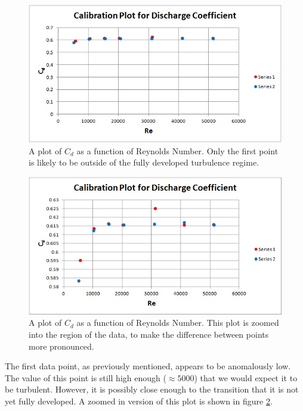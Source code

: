 \documentclass{article}
\begin{document}
  \begin{figure}[!htb]
   \begin{center}
    \includegraphics[width = 12 cm]{figs/cd_v_re_zero_axis.jpg}
    \caption{A plot of $C_d$ as a function of Reynolds Number. Only the first point is likely to be 
outside of the fully developed turbulence regime. }
    \label{orif}
   \end{center}
  \end{figure}

  \begin{figure}[!htb]
   \begin{center}
    \includegraphics[width = 12 cm]{figs/cd_v_re.jpg}
    \caption{A plot of $C_d$ as a function of Reynolds Number. This plot is zoomed into the region of the data, 
    to make the difference between points more pronounced.}
    \label{orif-zoom}
   \end{center}
  \end{figure}

The first data point, as previously mentioned, appears to be anomalously low. The value of this point is 
still high enough ($\approx 5000$) that we would expect it to be turbulent. However, it is possibly close enough 
to the transition that it is not yet fully developed. A zoomed in version of this plot is shown in figure \ref{orif-zoom}. 
\end{document}
